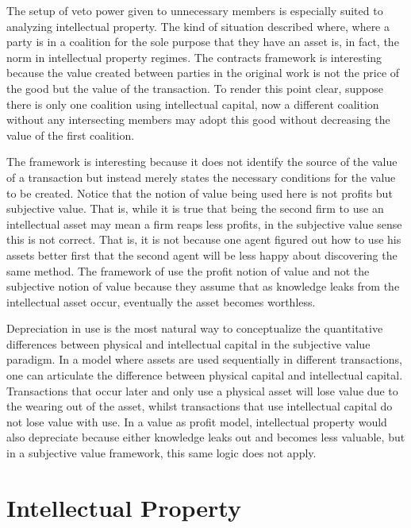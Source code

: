 \documentclass[12pt]{article}
\numberwithin{equation}{section}
\begin{document}
The setup of veto power given to unnecessary members is especially suited to analyzing intellectual property. The kind of situation described where, where a party is in a coalition for the sole purpose that they have an asset is, in fact, the norm in intellectual property regimes. The contracts framework is interesting because the value created between parties in the original work is not the price of the good but the value of the transaction. To render this point clear, suppose there is only one coalition using intellectual capital, now a different coalition without any intersecting members may adopt this good without decreasing the value of the first coalition.

The framework is interesting because it does not identify the source of the value of a transaction but instead merely states the necessary conditions for the value to be created. Notice that the notion of value being used here is not profits but subjective value. That is, while it is true that being the second firm to use an intellectual asset may mean a firm reaps less profits, in the subjective value sense this is not correct. That is, it is not because one agent figured out how to use his assets better first that the second agent will be less happy about discovering the same method. The framework of \cite{anton1994expropriation} use the profit notion of value and not the subjective notion of value because they assume that as knowledge leaks from the intellectual asset occur, eventually the asset becomes worthless.

Depreciation in use is the most natural way to conceptualize the quantitative differences between physical and intellectual capital in the subjective value paradigm. In a model where assets are used sequentially in different transactions, one can articulate the difference between physical capital and intellectual capital. Transactions that occur later and only use a physical asset will lose value due to the wearing out of the asset, whilst transactions that use intellectual capital do not lose value with use. In a value as profit model, intellectual property would also depreciate because either knowledge leaks out and becomes less valuable, but in a subjective value framework, this same logic does not apply.

\section{Intellectual Property}
\end{document}

